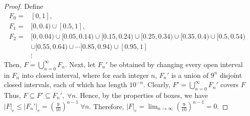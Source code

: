 \begin{answer}
    \begin{proof}
        Define
        \begin{equation}
            \begin{aligned}
                F_0 =& [0,1],\\
                F_1 =& [0,0.4) \cup [0.5,1],\\
                F_2 =& [0,0.04) \cup [0.05,0.14) \cup [0.15,0.24) \cup [0.25,0.34) \cup [0.35,0.4) \cup[0.5,0.54)\\
                &\cup [0.55,0.64) \cup \cdots [0.85,0.94) \cup [0.95,1]\\
                &\vdots
            \end{aligned}
        \end{equation}
        Then, $F = \bigcup_{n = 0}^{\infty} F_n$. Next, let $F_n'$ be obtained by changing every open interval in $F_n$ into closed interval, where for each integer $n$, $F_n'$ is a union of $9^{n}$ disjoint closed intervals, each of which has length $10^{-n}$. Clearly, $F' = \bigcup_{n = 0}^{\infty}F_n'$ covers $F$ Thus, $F \subseteq F' \subseteq F_n',\; \forall n$. Hence, by the properties of boxes, we have $\lvert F \rvert_e \leq \lvert F_n' \rvert_e = (\tfrac{9}{10})^{n-1} \; \forall n$. Therefore, $\lvert F \rvert_e = \lim_{n \to \infty}(\tfrac{9}{10})^{n-1} = 0$.
    \end{proof}
\end{answer}
